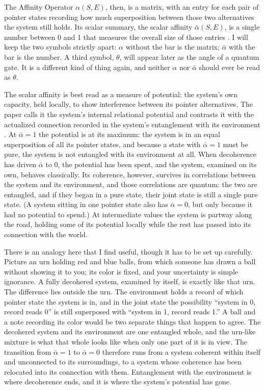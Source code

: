 The Affinity Operator $\alpha(S, E)$, then, is a matrix, with an entry for each pair of pointer states recording how much superposition between those two alternatives the system still holds. Its scalar summary, the scalar affinity $\bar{\alpha}(S, E)$, is a single number between 0 and 1 that measures the overall size of those entries \citep{AdamsRCT}. I will keep the two symbols strictly apart: $\alpha$ without the bar is the matrix; $\bar{\alpha}$ with the bar is the number. A third symbol, $\theta$, will appear later as the angle of a quantum gate. It is a different kind of thing again, and neither $\alpha$ nor $\bar{\alpha}$ should ever be read as $\theta$.

The scalar affinity is best read as a measure of potential: the system's own capacity, held locally, to show interference between its pointer alternatives. The paper calls it the system's internal relational potential and contrasts it with the actualized connection recorded in the system's entanglement with its environment \citep{AdamsRCT}. At $\bar{\alpha} = 1$ the potential is at its maximum: the system is in an equal superposition of all its pointer states, and because a state with $\bar{\alpha} = 1$ must be pure, the system is not entangled with its environment at all. When decoherence has driven $\bar{\alpha}$ to 0, the potential has been spent, and the system, examined on its own, behaves classically. Its coherence, however, survives in correlations between the system and its environment, and those correlations are quantum: the two are entangled, and if they began in a pure state, their joint state is still a single pure state. (A system sitting in one pointer state also has $\bar{\alpha} = 0$, but only because it had no potential to spend.) At intermediate values the system is partway along the road, holding some of its potential locally while the rest has passed into its connection with the world.

There is an analogy here that I find useful, though it has to be set up carefully. Picture an urn holding red and blue balls, from which someone has drawn a ball without showing it to you; its color is fixed, and your uncertainty is simple ignorance. A fully decohered system, examined by itself, is exactly like that urn. The difference lies outside the urn. The environment holds a record of which pointer state the system is in, and in the joint state the possibility ``system in 0, record reads 0'' is still superposed with ``system in 1, record reads 1.'' A ball and a note recording its color would be two separate things that happen to agree. The decohered system and its environment are one entangled whole, and the urn-like mixture is what that whole looks like when only one part of it is in view. The transition from $\bar{\alpha} = 1$ to $\bar{\alpha} = 0$ therefore runs from a system coherent within itself and unconnected to its surroundings, to a system whose coherence has been relocated into its connection with them. Entanglement with the environment is where decoherence ends, and it is where the system's potential has gone.

